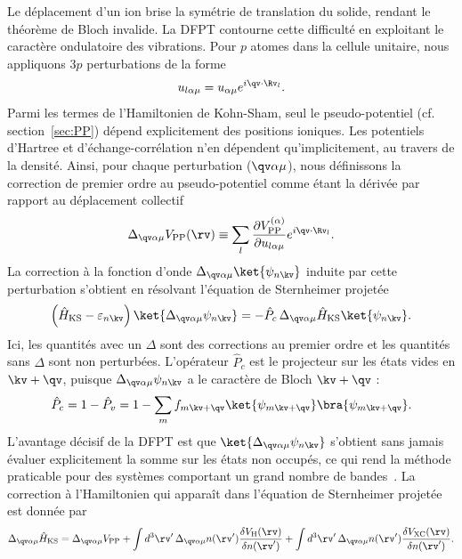 Le déplacement d'un ion brise la symétrie de translation du solide, rendant le théorème de Bloch invalide. La DFPT contourne cette difficulté en exploitant le caractère ondulatoire des vibrations. Pour $p$ atomes dans la cellule unitaire, nous appliquons $3p$ perturbations de la forme
\begin{equation}
    u_{l\alpha\mu} = u_{\alpha\mu}e^{i\qv\cdot\Rv_l}.
\end{equation}
Parmi les termes de l'Hamiltonien de Kohn-Sham, seul le pseudo-potentiel (cf. section~\ref{sec:PP}) dépend explicitement des positions ioniques. Les potentiels d'Hartree et d'échange-corrélation n'en dépendent qu'implicitement, au travers de la densité. Ainsi, pour chaque perturbation ($\qv\alpha\mu$), nous définissons la correction de premier ordre au pseudo-potentiel comme étant la dérivée par rapport au déplacement collectif
\begin{equation}
    \Delta_{\qv\alpha\mu}V_\text{PP}(\rv) \equiv \sum_l \frac{\partial V_\text{PP}^{(\alpha)}}{\partial u_{l\alpha\mu}}e^{i\qv\cdot\Rv_l}.
    \label{eqn:deltaVPP}
\end{equation} 
La correction à la fonction d'onde $\Delta_{\qv\alpha\mu}\ket{\psi_{n\kv}}$ induite par cette perturbation s'obtient en résolvant l'équation de Sternheimer projetée
\begin{equation}
    \left(\hat{H}_\text{KS}-\varepsilon_{n\kv}\right)\ket{\Delta_{\qv\alpha\mu}\psi_{n\kv}} = -\hat{P}_c\,\Delta_{\qv\alpha\mu}\hat{H}_\text{KS}\ket{\psi_{n\kv}}.
    \label{eqn:Sternheimer_projetée}
\end{equation}
Ici, les quantités avec un $\Delta$ sont des corrections au premier ordre et les quantités sans $\Delta$ sont non perturbées. L'opérateur $\hat{P}_c$ est le projecteur sur les états vides en $\kv+\qv$, puisque $\Delta_{\qv\alpha\mu}\psi_{n\kv}$ a le caractère de Bloch $\kv+\qv$ :
\begin{equation}
    \hat{P}_c = 1-\hat{P}_v = 1 - \sum_m f_{m\kv+\qv}\ket{\psi_{m\kv+\qv}}\bra{\psi_{m\kv+\qv}}.
\end{equation}
L'avantage décisif de la DFPT est que $\ket{\Delta_{\qv\alpha\mu}\psi_{n\kv}}$ s'obtient sans jamais évaluer explicitement la somme sur les états non occupés, ce qui rend la méthode praticable pour des systèmes comportant un grand nombre de bandes~\cite{baroniPhononsRelatedCrystal2001a}. La correction à l'Hamiltonien qui apparaît dans l'équation de Sternheimer projetée est donnée par
\begin{equation}
    \Delta_{\qv\alpha\mu} \hat{H}_\text{KS} = \Delta_{\qv\alpha\mu}V_\text{PP} + \int d^3\rv'\,\Delta_{\qv\alpha\mu} n(\rv')\frac{\delta V_\text{H}(\rv)}{\delta n(\rv')}+\int d^3\rv'\,\Delta_{\qv\alpha\mu}n(\rv')\frac{\delta V_\text{XC}(\rv)}{\delta n(\rv')}.
    \label{eqn:deltaH}
\end{equation}
